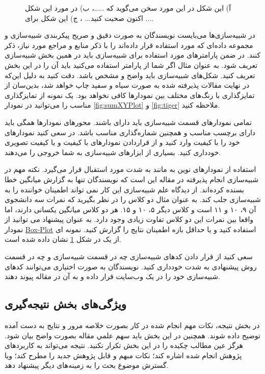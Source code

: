 \documentclass{CSICC2016}
\begin{document}
\begin{figure}
\begin{subfigure}[b]{0.31\textwidth}
\caption{}
\label{fig:EntropyVersus}
\end{subfigure}
\caption{
آ) این شکل در این مورد سخن می‌گوید که .....، ب) در مورد این شکل اکنون صحبت کنید... ، ج) این شکل برای ....
}
\label{fig:animals}
\end{figure}
در شبیه‌سازی‌ها می‌بایست نویسندگان به صورت دقیق و صریح پیکربندی شبیه‌سازی و مجموعه داده‌ای که مورد استفاده قرار داده‌اند را با ذکر منابع و مراجع مورد نیاز، ذکر کنند. در ضمن پارامترهای مورد استفاده برای شبیه‌سازی باید در همین بخش شبیه‌سازی تعریف شود. به عنوان مثال اگر شما از پارامتر 
استفاده می‌کنید باید آن را در این بخش تعریف کنید. شکل‌های شبیه‌سازی باید واضح و مشخص باشد. دقت کنید به دلیل این‌که در نهایت مقالات پذیرفته شده به صورت سیاه و سفید چاپ خواهد شد، بدین‌سان از تمایزگذاری با رنگ‌های مختلف بین نمودارها کافی نخواهد بود. یک نمونه از تمایزگذاری مناسب را می‌توانید در نمودار \ref{fig:sumXYPlot} و \ref{fig:tiger} ملاحظه کنید. 

تمامی نمودارهای قسمت شبیه‌سازی باید دارای   باشند. محور‌های نمودارها همگی باید دارای برچسب مناسب و همچنین شماره‌گذاری مناسب باشد. در \lr{\LaTeX} سعی کنید نمودارهای خود را با کیفیت  وارد کنید و از قراردادن نمودارهای  با کیفیت  و یا کیفیت تصویری خودداری کنید. بسیاری از ابزارهای شبیه‌سازی به شما خروجی   را می‌دهند. 

استفاده از نمودارهای نوین به مانند  به شدت مورد استقبال قرار می‌گیرد. نکته مهم در شبیه‌سازی
انجام پذیرفته در مقاله این است که نویسندگان تنها به گزارش میانگین خطا بسنده کرده‌اند. از دیدگاه علم شبیه‌سازی این کار نمی تواند اطمینان خواننده را به شبیه‌سازی جلب کند. به عنوان مثال دو کلاس را در نظر بگیرید که نمرات سه دانشجوی آن ۹، ۱۰ و ۱۱ است و کلاس دیگر ۵، ۱۰ و ۱۵. هر دو کلاس میانگین یکسانی دارند، اما واقعا بین نمرات این دو کلاس تفاوت زیادی وجود دارد. به عنوان پیشنهاد می توانید از نمودار
\href{https://en.wikipedia.org/wiki/Box_plot}{Box-Plot}
استفاده کنید و یا حداقل بازه اطمینان نتایج را گزارش کنید. نمونه ای از یک  در شکل
\ref{fig:EntropyVersus}
نشان داده شده است. 

سعی کنید از قرار دادن کدهای شبیه‌سازی چه در قسمت شبیه‌سازی و چه در قسمت روش پیشنهادی به شدت خودداری کنید. نویسندگان به صورت اختیاری می‌توانند کدهای شبیه‌سازی خود را در یک وب‌سایت قرار داده و به آن در مقاله پیوند دهند. 

\subsection{ویژگی‌های بخش نتیجه‌گیری}
در بخش نتيجه، نكات مهم انجام شده در كار بصورت خلاصه مرور و نتايج به دست آمده توضيح داده شوند. همچنين در اين بخش بايد سهم علمي مقاله بصورت واضح بيان شود. هرگز عين مطالب چكيده را در اين بخش تكرار نكنيد. نتيجه می‏‌تواند به کاربردهای پژوهش انجام شده اشاره کند؛ نکات مبهم و قابل پژوهش جديد را مطرح کند؛ ويا گسترش موضوع بحث را به زمينه‏‌های ديگر پيشنهاد دهد.
\end{document}
